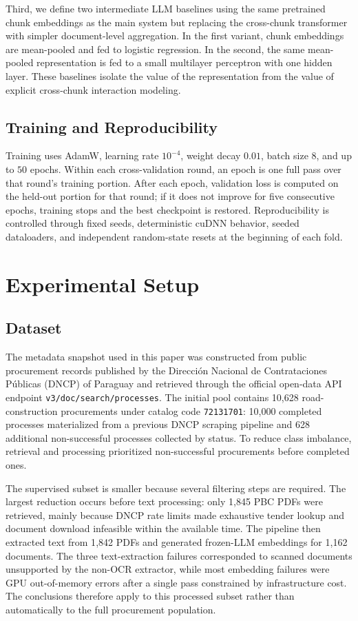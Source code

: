 \documentclass[conference]{IEEEtran}
\begin{document}
Third, we define two intermediate LLM baselines using the same pretrained chunk embeddings as the main system but replacing the cross-chunk transformer with simpler document-level aggregation. In the first variant, chunk embeddings are mean-pooled and fed to logistic regression. In the second, the same mean-pooled representation is fed to a small multilayer perceptron with one hidden layer. These baselines isolate the value of the representation from the value of explicit cross-chunk interaction modeling.

\subsection{Training and Reproducibility}
Training uses AdamW, learning rate $10^{-4}$, weight decay $0.01$, batch size $8$, and up to $50$ epochs. Within each cross-validation round, an epoch is one full pass over that round's training portion. After each epoch, validation loss is computed on the held-out portion for that round; if it does not improve for five consecutive epochs, training stops and the best checkpoint is restored. Reproducibility is controlled through fixed seeds, deterministic cuDNN behavior, seeded dataloaders, and independent random-state resets at the beginning of each fold.

\section{Experimental Setup}
\subsection{Dataset}
The metadata snapshot used in this paper was constructed from public procurement records published by the Dirección Nacional de Contrataciones Públicas (DNCP) of Paraguay and retrieved through the official open-data API endpoint \texttt{v3/doc/search/processes}. The initial pool contains 10{,}628 road-construction procurements under catalog code \texttt{72131701}: 10{,}000 completed processes materialized from a previous DNCP scraping pipeline and 628 additional non-successful processes collected by status. To reduce class imbalance, retrieval and processing prioritized non-successful procurements before completed ones.

The supervised subset is smaller because several filtering steps are required. The largest reduction occurs before text processing: only 1{,}845 PBC PDFs were retrieved, mainly because DNCP rate limits made exhaustive tender lookup and document download infeasible within the available time. The pipeline then extracted text from 1{,}842 PDFs and generated frozen-LLM embeddings for 1{,}162 documents. The three text-extraction failures corresponded to scanned documents unsupported by the non-OCR extractor, while most embedding failures were GPU out-of-memory errors after a single pass constrained by infrastructure cost. The conclusions therefore apply to this processed subset rather than automatically to the full procurement population.
\end{document}
